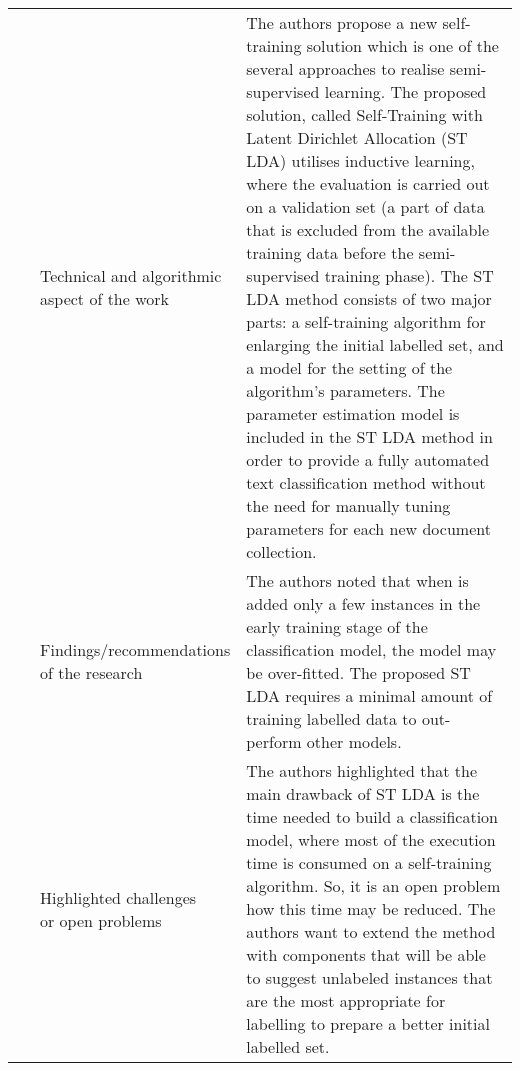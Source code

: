 \begin{landscape}
\begin{longtable}{lp{}p{}}
	\multirow{3}[0]{*}{~\citep{Pavlinek2017}} & 
    \specialcell{Technical and algorithmic \\ aspect of the work} &
    The authors propose a new self-training solution which is one of the several approaches to realise semi-supervised learning. The proposed solution, called Self-Training with Latent Dirichlet Allocation (ST LDA)  utilises inductive learning, where the evaluation is carried out on a validation set (a part of data that is excluded from the available training data before the semi-supervised training phase). The ST LDA method consists of two major parts: a self-training algorithm for enlarging the initial labelled set, and a model for the setting of the algorithm's parameters. The parameter estimation model is included in the ST LDA method in order to provide a fully automated text classification method without the need for manually tuning parameters for each new document collection. 
    \\ & 
    \specialcell{Findings/recommendations \\ of the research} & 
    The authors noted that when is added only a few instances in the early training stage of the classification model, the model may be over-fitted. The proposed ST LDA requires a minimal amount of training labelled data to out-perform other models.
    \\ & 
    \specialcell{Highlighted challenges \\ or open problems} & 
    The authors highlighted that the main drawback of ST LDA is the time needed to build a classification model, where most of the execution time is consumed on a self-training algorithm. So, it is an open problem how this time may be reduced. The authors want to extend the method with components that will be able to suggest unlabeled instances that are the most appropriate for labelling to prepare a better initial labelled set. 
    \\
	

\end{longtable}
\end{landscape}
